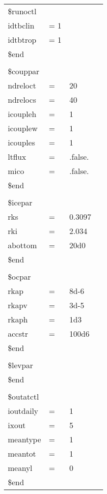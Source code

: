 \begin{tabular}{llll}
                  \\
\$runoctl         \\
 idtbclin &  = 1  \\
 idtbtrop &  = 1  \\
\$end             \\
                                \\
\$couppar         \\
 ndreloct &  = & 20 \\
 ndrelocs &  = & 40 \\
 icoupleh &  = & 1  \\
 icouplew &  = & 1  \\
 icouples &  = & 1  \\
 ltflux   &  = & .false. \\
 mico     &  = & .false. \\
\$end             \\
                                \\
\$icepar           \\
 rks      &  = &  0.3097 \\
 rki      &  = &  2.034  \\
 abottom  &  = &  20d0  \\
\$end             \\
                                \\
\$ocpar           \\
 rkap    &  = &  8d-6  \\
 rkapv   &  = &  3d-5  \\
 rkaph   &  = &  1d3   \\
 accstr  &  = &  100d6 \\
\$end             \\
                                \\
\$levpar          \\
\$end             \\
                                \\
\$outatctl&       \\
  ioutdaily &   = & 1    \\
  ixout     &   = & 5    \\
  meantype  &   = & 1    \\
  meantot   &   = & 1    \\
  meanyl    &   = & 0    \\
\$end                    \\
\end{tabular}
